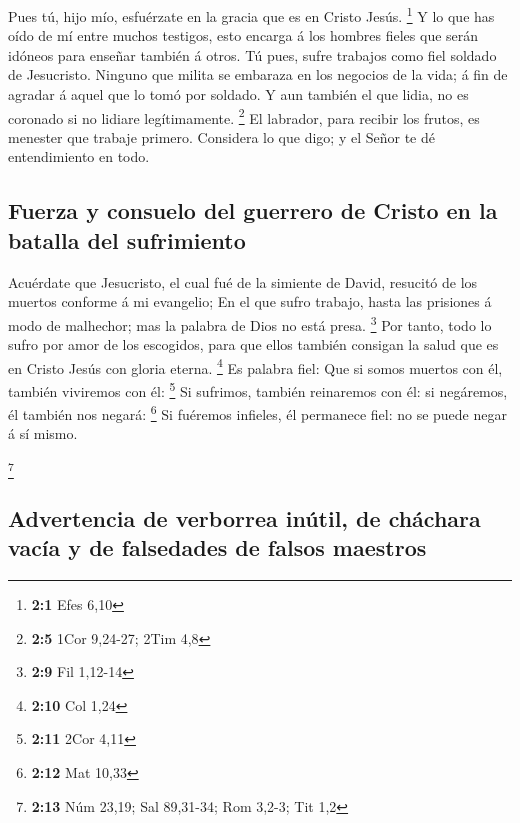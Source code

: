  Pues tú, hijo mío, esfuérzate en la gracia que es en Cristo
Jesús. \footnote{\textbf{2:1} Efes 6,10}  Y lo que has oído
de mí entre muchos testigos, esto encarga á los hombres fieles que serán
idóneos para enseñar también á otros.  Tú pues, sufre
trabajos como fiel soldado de Jesucristo.  Ninguno que
milita se embaraza en los negocios de la vida; á fin de agradar á aquel
que lo tomó por soldado.  Y aun también el que lidia, no es
coronado si no lidiare legítimamente. \footnote{\textbf{2:5} 1Cor
  9,24-27; 2Tim 4,8}  El labrador, para recibir los frutos,
es menester que trabaje primero.  Considera lo que digo; y
el Señor te dé entendimiento en todo.

\hypertarget{fuerza-y-consuelo-del-guerrero-de-cristo-en-la-batalla-del-sufrimiento}{%
\subsection{Fuerza y \hspace{0pt}\hspace{0pt}consuelo del guerrero de
Cristo en la batalla del
sufrimiento}\label{fuerza-y-consuelo-del-guerrero-de-cristo-en-la-batalla-del-sufrimiento}}

 Acuérdate que Jesucristo, el cual fué de la simiente de
David, resucitó de los muertos conforme á mi evangelio;  En
el que sufro trabajo, hasta las prisiones á modo de malhechor; mas la
palabra de Dios no está presa. \footnote{\textbf{2:9} Fil 1,12-14}
 Por tanto, todo lo sufro por amor de los escogidos, para
que ellos también consigan la salud que es en Cristo Jesús con gloria
eterna. \footnote{\textbf{2:10} Col 1,24}  Es palabra fiel:
Que si somos muertos con él, también viviremos con él: \footnote{\textbf{2:11}
  2Cor 4,11}  Si sufrimos, también reinaremos con él: si
negáremos, él también nos negará: \footnote{\textbf{2:12} Mat 10,33}
 Si fuéremos infieles, él permanece fiel: no se puede negar
á sí mismo.

\footnote{\textbf{2:13} Núm 23,19; Sal 89,31-34; Rom 3,2-3; Tit 1,2}

\hypertarget{advertencia-de-verborrea-inuxfatil-de-chuxe1chara-vacuxeda-y-de-falsedades-de-falsos-maestros}{%
\subsection{Advertencia de verborrea inútil, de cháchara vacía y de
falsedades de falsos
maestros}\label{advertencia-de-verborrea-inuxfatil-de-chuxe1chara-vacuxeda-y-de-falsedades-de-falsos-maestros}}

